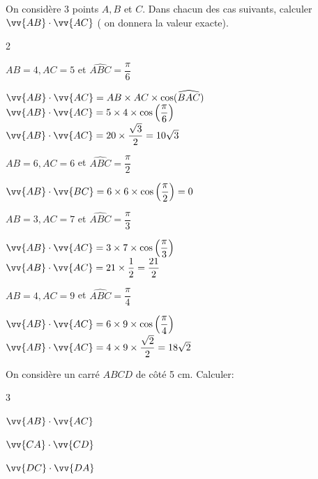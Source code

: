 \documentclass[12pt,a4paper]{article}  %
\begin{document}
\vspace{-.3cm} 
On considère 3 points $A, B$ et $C$. Dans chacun des cas suivants, calculer $\vv{A B} \cdot \vv{A C}$ ( on donnera la valeur exacte).
\begin{multicols}{2}
\begin{enumMet}
    \item $A B=4, A C=5$ et $\widehat{A B C}=\dfrac{\pi}{6}$\quad {}\\
    \begin{corrBox}
        $\vv{A B} \cdot \vv{A C}=A B \times A C \times \cos (\widehat{B A C})$\\
        $\vv{A B} \cdot \vv{AC}=5 \times 4 \times \cos \left(\dfrac{\pi}{6}\right)$\\
        $\vv{A B} \cdot \vv{AC}=20 \times \dfrac{\sqrt{3}}{2}=10 \sqrt{3}$
    \end{corrBox}
    \item $A B=6, A C=6$ et $\widehat{A B C}=\dfrac{\pi}{2}$\quad {}\\
    \begin{corrBox}
        $\vv{A B} \cdot \vv{B C}=6 \times 6 \times \cos \left(\dfrac{\pi}{2}\right)=0$
    \end{corrBox}
    \item $A B=3, A C=7$ et $\widehat{A B C}=\dfrac{\pi}{3}$\quad {}\\
    \begin{corrBox}
        $\vv{A B} \cdot \vv{A C}=3 \times 7 \times \cos \left(\dfrac{\pi}{3}\right)$\\
        $\vv{A B} \cdot \vv{A C}=21 \times \dfrac{1}{2}=\dfrac{21}{2}$
    \end{corrBox}
    \item $A B=4, A C=9$ et $\widehat{A B C}=\dfrac{\pi}{4}$\quad {}\\
    \begin{corrBox}
        $\vv{A B} \cdot \vv{A C}=6 \times 9 \times \cos \left(\dfrac{\pi}{4}\right)$\\
        $\vv{A B} \cdot \vv{A C}=4 \times 9 \times \dfrac{\sqrt{2}}{2}=18 \sqrt{2}$
    \end{corrBox}
\end{enumMet}
\end{multicols}




\vspace{-0.3cm}
On considère un carré $A B C D$ de côté 5 cm. Calculer:
\begin{multicols}{3}
\begin{enumMet}
    \item $\vv{A B} \cdot \vv{A C}$\quad {}
    \item $\vv{C A} \cdot \vv{C D}$\quad {}
    \item $\vv{D C} \cdot \vv{D A}$\quad {}
\end{enumMet}
\end{multicols}
\end{document}
